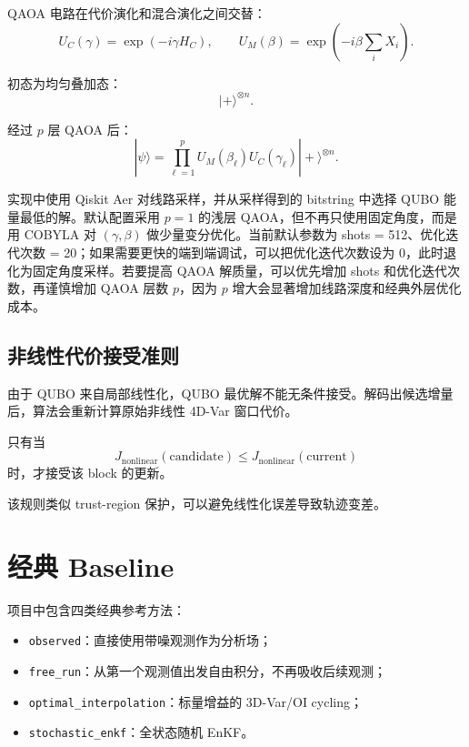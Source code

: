 \documentclass[UTF8,a4paper,12pt]{ctexart}
\begin{document}
QAOA 电路在代价演化和混合演化之间交替：
\begin{equation}
  U_C(\gamma) = \exp(-i\gamma H_C),
  \qquad
  U_M(\beta) = \exp\left(-i\beta \sum_i X_i\right).
\end{equation}

初态为均匀叠加态：
\begin{equation}
  |+\rangle^{\otimes n}.
\end{equation}

经过 $p$ 层 QAOA 后：
\begin{equation}
  |\psi\rangle
  =
  \prod_{\ell=1}^{p}
  U_M(\beta_{\ell})
  U_C(\gamma_{\ell})
  |+\rangle^{\otimes n}.
\end{equation}

实现中使用 Qiskit Aer 对线路采样，并从采样得到的 bitstring 中选择 QUBO 能量最低的解。默认配置采用 $p=1$ 的浅层 QAOA，但不再只使用固定角度，而是用 COBYLA 对 $(\gamma,\beta)$ 做少量变分优化。当前默认参数为 shots = 512、优化迭代次数 = 20；如果需要更快的端到端调试，可以把优化迭代次数设为 0，此时退化为固定角度采样。若要提高 QAOA 解质量，可以优先增加 shots 和优化迭代次数，再谨慎增加 QAOA 层数 $p$，因为 $p$ 增大会显著增加线路深度和经典外层优化成本。

\subsection{非线性代价接受准则}

由于 QUBO 来自局部线性化，QUBO 最优解不能无条件接受。解码出候选增量后，算法会重新计算原始非线性 4D-Var 窗口代价。

只有当
\begin{equation}
  J_{\mathrm{nonlinear}}(\mathrm{candidate})
  \le
  J_{\mathrm{nonlinear}}(\mathrm{current})
\end{equation}
时，才接受该 block 的更新。

该规则类似 trust-region 保护，可以避免线性化误差导致轨迹变差。

\section{经典 Baseline}

项目中包含四类经典参考方法：

\begin{itemize}
  \item \texttt{observed}：直接使用带噪观测作为分析场；
  \item \texttt{free\_run}：从第一个观测值出发自由积分，不再吸收后续观测；
  \item \texttt{optimal\_interpolation}：标量增益的 3D-Var/OI cycling；
  \item \texttt{stochastic\_enkf}：全状态随机 EnKF。
\end{itemize}
\end{document}

